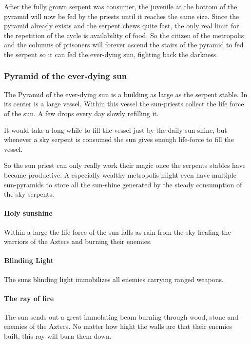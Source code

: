 \documentclass[a4paper]{book}
\begin{document}
				After the fully grown serpent was consumer,
				the juvenile at the bottom of the pyramid will now be fed by the priests until it reaches the same size.
				Since the pyramid already exists and the serpent chews quite fast,
				the only real limit for the repetition of the cycle is availability of food.
				So the citizen of the metropolis and the columns of prisoners will forever ascend the stairs
				of the pyramid to fed the serpent so it can fed the ever-dying sun,
				fighting back the darkness.

		\subsubsection{Pyramid of the ever-dying sun}
			The Pyramid of the ever-dying sun is a building as large as the serpent stable.
			In its center is a large vessel.
			Within this vessel the sun-priests collect the life force of the sun.
			A few drops every day slowly refilling it.

			It would take a long while to fill the vessel just by the daily sun shine,
			but whenever a sky serpent is consumed the sun gives enough life-force
			to fill the vessel.

			So the sun priest can only really work their magic once the serpents stables
			have become productive.
			A especially wealthy metropolis might even have multiple sun-pyramids
			to store all the sun-shine generated by the steady consumption of the sky serpents.

			\paragraph{Holy sunshine}
				Within a large the life-force of the sun falls as rain from the sky healing
				the warriors of the \gls{Aztecs} and burning their enemies.

			\paragraph{Blinding Light}
				The suns blinding light immobilizes all enemies carrying ranged weapons.

			\paragraph{The ray of fire}
				The sun sends out a great immolating beam burning through wood, stone and enemies
				of the \gls{Aztecs}.
				No matter how hight the walls are that their enemies built,
				this ray will burn them down.
\end{document}
